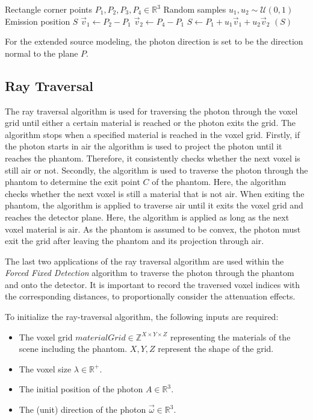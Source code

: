 \begin{algorithm}[H]
\caption{Photon Position Sampling for an Extended Source}
\label{alg:extendedSourceSampling}
\begin{algorithmic}[1]
\Require Rectangle corner points $P_1, P_2, P_3, P_4 \in \mathbb{R}^3$
\Require Random samples $u_1,u_2 \sim \mathcal{U}(0,1)$
\Ensure Emission position $S$
\State $\vec{v}_1 \gets P_2 - P_1$
\State $\vec{v}_2 \gets P_4 - P_1$
\State $S \gets P_1 + u_1 \vec{v}_1 + u_2 \vec{v}_2$
\State \Return $(S)$
\end{algorithmic}
\end{algorithm}

For the extended source modeling, the photon direction is set to be the direction normal to the plane $P$.

\subsection{Ray Traversal}
\label{sec:rayTraversal}

The ray traversal algorithm is used for traversing the photon through the voxel
grid until either a certain material is reached or the photon exits the grid.
The algorithm stops when a specified material is reached in the voxel grid.
Firstly, if the photon starts in air the algorithm is used to project the photon
until it reaches the phantom. Therefore, it consistently checks whether the next
voxel is still air or not. Secondly, the algorithm is used to traverse the
photon through the phantom to determine the exit point $C$ of the phantom. Here,
the algorithm checks whether the next voxel is still a material that is not air.
When exiting the phantom, the algorithm is applied to traverse air until it
exits the voxel grid and reaches the detector plane. Here, the algorithm is
applied as long as the next voxel material is air. As the phantom is assumed to
be convex, the photon must exit the grid after leaving the phantom and its
projection through air.

The last two applications of the ray traversal algorithm are used within the
\emph{Forced Fixed Detection} algorithm to traverse the photon through the
phantom and onto the detector. It is important to record the traversed voxel
indices with the corresponding distances, to proportionally consider the
attenuation effects.

To initialize the ray-traversal algorithm, the following inputs are required:
\begin{itemize}
    \item The voxel grid $materialGrid \in \mathbb{Z}^{X \times Y \times Z}$
    representing the materials of the scene including the phantom. $X,Y,Z$ represent
    the shape of the grid.
    \item The voxel size $\lambda \in \mathbb{R}^+$.
    \item The initial position of the photon $A \in \mathbb{R}^3$.
    \item The (unit) direction of the photon $\vec{\omega} \in \mathbb{R}^3$.
\end{itemize}


